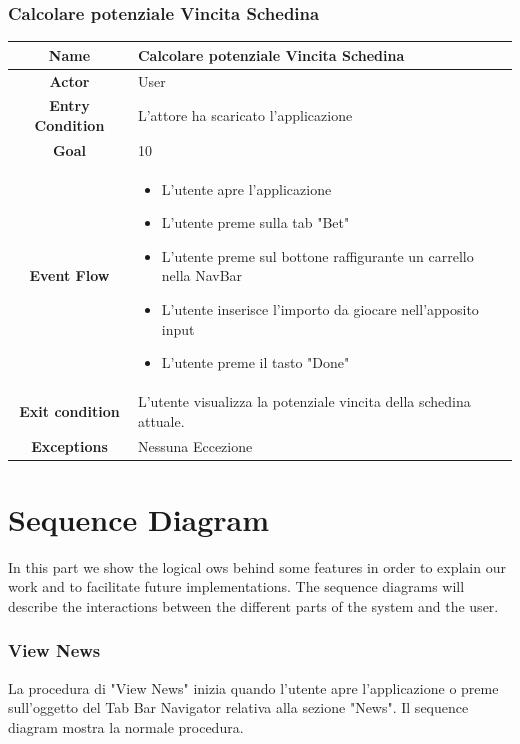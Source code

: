 \documentclass[numbers=noenddot, 12pt, a4paper, oneside]{scrbook}
\begin{document}
\subsection*{Calcolare potenziale Vincita Schedina}
\begin{tabular}{|c|p{}|}
	\hline
	\parbox[c][6ex]{6ex}{\centering \textbf{Name}} & Calcolare potenziale Vincita Schedina\\
	\hline
	\parbox[c][6ex]{6ex}{\centering \textbf{Actor}} & User \\
	\hline
	\parbox[c][10ex]{15ex}{\centering \textbf{Entry Condition}} & L'attore ha scaricato l'applicazione\\
	\hline
	\parbox[c][6ex]{15ex}{\centering \textbf{Goal}} &  10\\
	\hline
	\parbox[c][10ex]{12ex}{\centering \textbf{Event Flow}} & \begin{itemize}
		\item L'utente apre l'applicazione
		\item L'utente preme sulla tab "Bet"
		\item L'utente preme sul bottone raffigurante un carrello nella NavBar
		\item L'utente inserisce l'importo da giocare nell'apposito input
		\item L'utente preme il tasto "Done"
	\end{itemize}\\
	\hline
	\parbox[c][7ex]{12ex}{\centering \textbf{Exit condition}} & L'utente visualizza la potenziale vincita della schedina attuale.\\\hline
	\parbox[c][10ex]{13ex}{\centering \textbf{Exceptions}} & Nessuna Eccezione \\ \hline	
\end{tabular}

\chapter{Sequence Diagram}
In this part we show the logical ows behind some features in order to explain our work and to facilitate future implementations. The sequence diagrams will describe the interactions between the different parts of the system and the user.
\subsection*{View News}
La procedura di "View News" inizia quando l'utente apre l'applicazione o preme sull'oggetto del Tab Bar Navigator relativa alla sezione "News". Il sequence diagram mostra la normale procedura.
\end{document}

